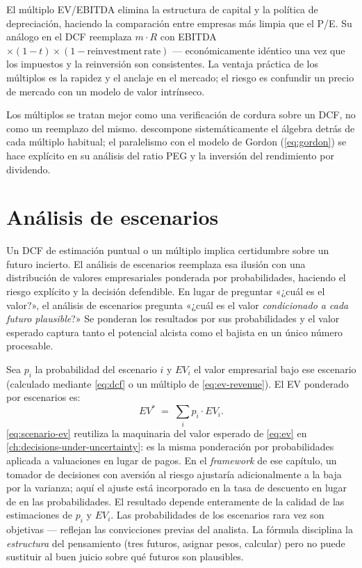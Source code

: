 El múltiplo EV/EBITDA elimina la estructura de capital y la política de depreciación, haciendo la
comparación entre empresas más limpia que el P/E. Su análogo en el DCF reemplaza \(m\cdot R\) con
EBITDA\(\times(1-t)\times(1-\mathrm{reinvestment\,rate})\) --- económicamente idéntico una vez que
los impuestos y la reinversión son consistentes. La ventaja práctica de los múltiplos es la rapidez y
el anclaje en el mercado; el riesgo es confundir un precio de mercado con un modelo de valor intrínseco.

Los múltiplos se tratan mejor como una verificación de cordura sobre un DCF, no como un reemplazo del mismo.
\textcite{damodaran2012} descompone sistemáticamente el álgebra detrás de cada múltiplo habitual;
el paralelismo con el modelo de Gordon (\cref{eq:gordon}) se hace explícito
en su análisis del ratio PEG y la inversión del rendimiento por dividendo.

\section{Análisis de escenarios}\label{sec:scenario-analysis}

Un DCF de estimación puntual o un múltiplo implica certidumbre sobre un futuro incierto. El análisis de
escenarios reemplaza esa ilusión con una distribución de valores empresariales ponderada por probabilidades,
haciendo el riesgo explícito y la decisión defendible. En lugar de preguntar «¿cuál es el valor?», el
análisis de escenarios pregunta «¿cuál es el valor \emph{condicionado a cada futuro plausible}?» Se ponderan
los resultados por sus probabilidades y el valor esperado captura tanto el potencial alcista como el
bajista en un único número procesable.

Sea \(p_i\) la probabilidad del escenario \(i\) y \(EV_i\) el valor empresarial bajo ese escenario
(calculado mediante \cref{eq:dcf} o un múltiplo de \cref{eq:ev-revenue}). El EV ponderado por escenarios es:
\begin{equation}\label{eq:scenario-ev}
  EV^* \;=\; \sum_{i} p_i \cdot EV_i.
\end{equation}
\cref{eq:scenario-ev} reutiliza la maquinaria del valor esperado de \cref{eq:ev} en
\cref{ch:decisions-under-uncertainty}: es la misma ponderación por probabilidades aplicada a valuaciones
en lugar de pagos. En el \emph{framework} de ese capítulo, un tomador de decisiones con aversión al riesgo
ajustaría adicionalmente a la baja por la varianza; aquí el ajuste está incorporado en la tasa de descuento
en lugar de en las probabilidades. El resultado depende enteramente de la calidad de las estimaciones de
\(p_i\) y \(EV_i\). Las probabilidades de los escenarios rara vez son objetivas --- reflejan las
convicciones previas del analista. La fórmula disciplina la \emph{estructura} del pensamiento (tres futuros,
asignar pesos, calcular) pero no puede sustituir al buen juicio sobre qué futuros son plausibles.

